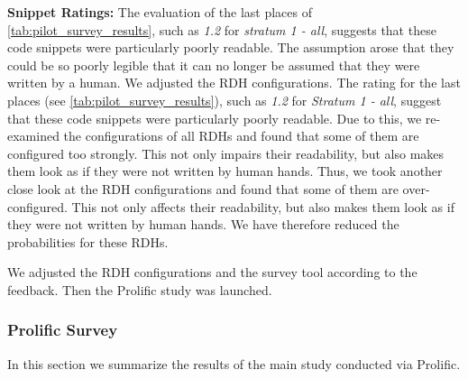 \documentclass[%
class=scrreprt,
chapterprefix=false,%
open=right,%
twoside=false,%
paper=a4,%
logofile={Logo\_zentral\_farbig\_EN.png},%
thesistype=master,%
UKenglish,%
]{se2thesis}
\theoremstyle{definition}
\begin{document}
	\textbf{Snippet Ratings:}
	The evaluation of the last places of \autoref{tab:pilot_survey_results}, such as \textit{1.2} for \textit{stratum 1 - all}, suggests that these code snippets were particularly poorly readable. The assumption arose that they could be so poorly legible that it can no longer be assumed that they were written by a human.
	We adjusted the RDH configurations. The rating for the last places (see \autoref{tab:pilot_survey_results}), such as \textit{1.2} for \textit{Stratum 1 - all}, suggest that these code snippets were particularly poorly readable. Due to this, we re-examined the configurations of all RDHs and found that some of them are configured too strongly. This not only impairs their readability, but also makes them look as if they were not written by human hands.
	Thus, we took another close look at the RDH configurations and found that some of them are over-configured. This not only affects their readability, but also makes them look as if they were not written by human hands. We have therefore reduced the probabilities for these RDHs.
	
	We adjusted the RDH configurations and the survey tool according to the feedback. Then the Prolific study was launched.

\subsubsection{Prolific Survey} \label{Prolific Survey}
	In this section we summarize the results of the main study conducted via Prolific.
	
	
\end{document}
